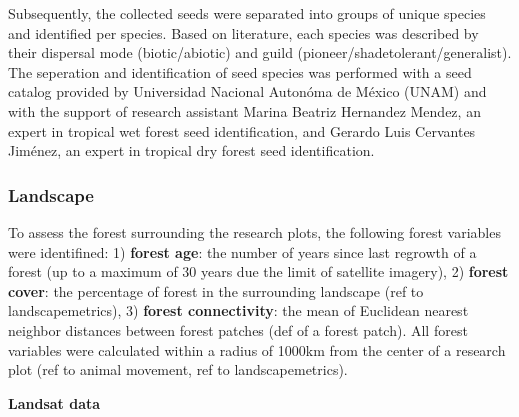 Subsequently, the collected seeds were separated into groups of unique species and identified per species. Based on literature, each species was described by their dispersal mode (biotic/abiotic) and guild (pioneer/shadetolerant/generalist). The seperation and identification of seed species was performed with a seed catalog provided by Universidad Nacional Autonóma de México (UNAM) and with the support of research assistant Marina Beatriz Hernandez Mendez, an expert in tropical wet forest seed identification, and Gerardo Luis Cervantes Jiménez, an expert in tropical dry forest seed identification. 


\subsubsection{Landscape}

To  assess the forest surrounding the research plots, the following forest variables were identifined: 1) \textbf{forest age}: the number of years since last regrowth of a forest (up to a maximum of 30 years due the limit of satellite imagery), 2) \textbf{forest cover}: the percentage of forest in the surrounding landscape (ref to landscapemetrics), 3) \textbf{forest connectivity}: the mean of Euclidean nearest neighbor distances between forest patches (def of a forest patch). All forest variables were calculated within a radius of 1000km from the center of a research plot (ref to animal movement, ref to landscapemetrics).  

\textbf{Landsat data}\\

